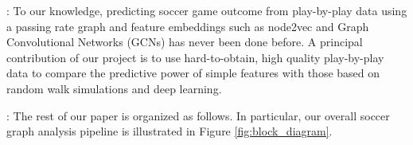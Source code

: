 
:
To our knowledge, predicting soccer game outcome from play-by-play data using a passing rate graph and feature embeddings such as node2vec and Graph Convolutional Networks (GCNs) has never been done before.
A principal contribution of our project is to use hard-to-obtain, high quality play-by-play data
to compare the predictive power of simple features with those based on random walk simulations and deep learning.

:
The rest of our paper is organized as follows. In particular, our overall soccer graph analysis pipeline is illustrated in Figure \ref{fig:block_diagram}.
